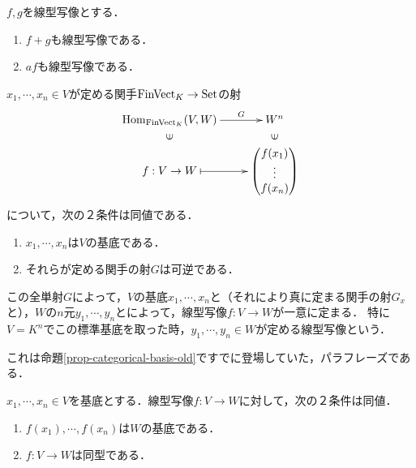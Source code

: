 \documentclass[uplatex, 12pt, dvipdfmx]{jsreport}
\begin{document}
\begin{proposition}
    $f,g$を線型写像とする．
    \begin{enumerate}
        \item $f+g$も線型写像である．
        \item $af$も線型写像である．
    \end{enumerate}
\end{proposition}

\begin{shadebox}\begin{theorem}\label{prop-categorical-basis}
    $x_1,\cdots,x_n\in V$が定める関手$\mathrm{FinVect}_K\to\mathrm{Set}$の射
    \[\xymatrix@R-2pc{
        {\Hom_{\FinVect_K}(V,W)}\ar[r]^-{G}&W^n\\
        \rotatebox[origin=c]{90}{$\in$}&\rotatebox[origin=c]{90}{$\in$}\\
        {f:V\to W}\ar@{|->}[r]&{\begin{pmatrix}f(x_1)\\\vdots\\f(x_n)\end{pmatrix}}
    }\]
    について，次の２条件は同値である．
    \begin{enumerate}
        \item $x_1,\cdots,x_n$は$V$の基底である．
        \item それらが定める関手の射$G$は可逆である．
    \end{enumerate}
\end{theorem}\end{shadebox}
\begin{remark}[$n$元が定める線型写像]
    この全単射$G$によって，$V$の基底$x_1,\cdots,x_n$と（それにより真に定まる関手の射$G_x$と），$W$の$n$元$y_1,\cdots,y_n$とによって，線型写像$f:V\to W$が一意に定まる．
    特に$V=K^n$でこの標準基底を取った時，$y_1,\cdots,y_n\in W$が定める線型写像という．

    これは命題\ref{prop-categorical-basis-old}ですでに登場していた，パラフレーズである．
\end{remark}

\begin{proposition}
    $x_1,\cdots,x_n\in V$を基底とする．線型写像$f:V\to W$に対して，次の２条件は同値．
    \begin{enumerate}
        \item $f(x_1),\cdots,f(x_n)$は$W$の基底である．
        \item $f:V\to W$は同型である．
    \end{enumerate}
\end{proposition}
\end{document}
